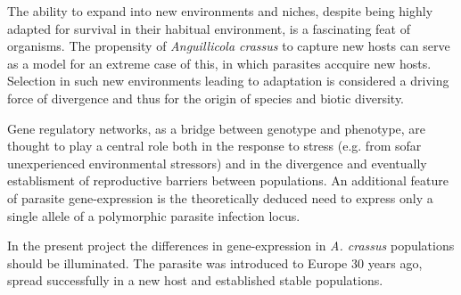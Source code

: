 


\begin{abstracts}        %

  The ability to expand into new environments and niches, despite
  being highly adapted for survival in their habitual environment, is
  a fascinating feat of organisms. The propensity of
  \textit{Anguillicola crassus} to capture new hosts can serve as a
  model for an extreme case of this, in which parasites accquire new
  hosts. Selection in such new environments leading to adaptation is
  considered a driving force of divergence and thus for the origin of
  species and biotic diversity.

  Gene regulatory networks, as a bridge between genotype and
  phenotype, are thought to play a central role both in the response
  to stress (e.g. from sofar unexperienced environmental stressors)
  and in the divergence and eventually establisment of reproductive
  barriers between populations. An additional feature of parasite
  gene-expression is the theoretically deduced need to express only a
  single allele of a polymorphic parasite infection locus.

  In the present project the differences in gene-expression in
  \textit{A. crassus} populations should be illuminated. The parasite
  was introduced to Europe 30 years ago, spread successfully in a new
  host and established stable populations.

\end{abstracts}



     